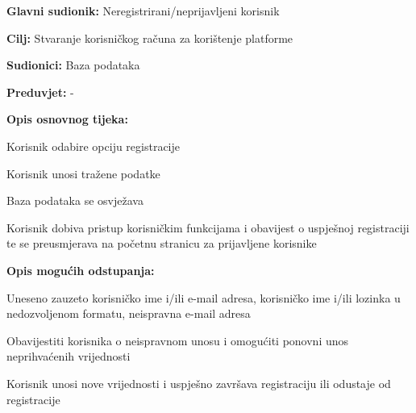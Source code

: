 \noindent {}
\begin{packed_item}
	
	\item \textbf{Glavni sudionik:} Neregistrirani/neprijavljeni korisnik
	\item  \textbf{Cilj:} Stvaranje korisničkog računa za korištenje platforme
	\item  \textbf{Sudionici:} Baza podataka
	\item  \textbf{Preduvjet:} -
	\item  \textbf{Opis osnovnog tijeka:}
	
	\item[] \begin{packed_enum}
		
		\item Korisnik odabire opciju registracije
		\item Korisnik unosi tražene podatke 
		\item Baza podataka se osvježava
		\item Korisnik dobiva pristup korisničkim funkcijama i obavijest o uspješnoj registraciji te se preusmjerava na početnu stranicu za prijavljene korisnike 
		
	\end{packed_enum}
	
	\item  \textbf{Opis mogućih odstupanja:}
	
	\item[] \begin{packed_item}
		
		\item[2.a] Uneseno zauzeto korisničko ime i/ili e-mail adresa, korisničko ime i/ili lozinka u nedozvoljenom formatu, neispravna e-mail adresa 
		\item[] \begin{packed_enum}
			
			\item Obavijestiti korisnika o neispravnom unosu i omogućiti ponovni unos neprihvaćenih vrijednosti
			\item Korisnik unosi nove vrijednosti i uspješno završava registraciju ili odustaje od registracije 
			
		\end{packed_enum}
	\end{packed_item}
	
\end{packed_item}


